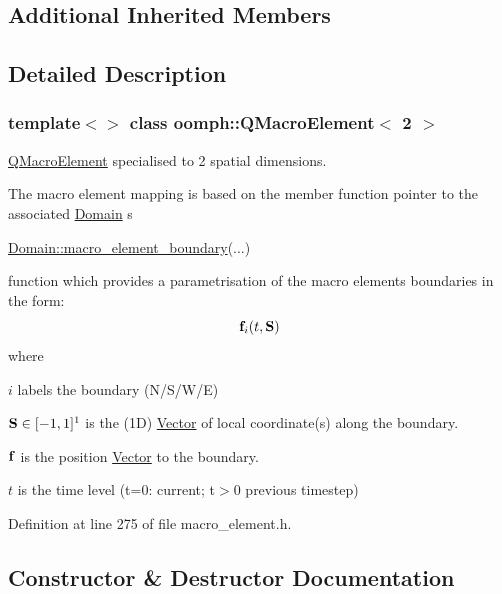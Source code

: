 \subsection*{Additional Inherited Members}


\subsection{Detailed Description}
\subsubsection*{template$<$$>$\newline
class oomph\+::\+Q\+Macro\+Element$<$ 2 $>$}

\hyperlink{classoomph_1_1QMacroElement}{Q\+Macro\+Element} specialised to 2 spatial dimensions.

The macro element mapping is based on the member function pointer to the associated \hyperlink{classoomph_1_1Domain}{Domain} \textquotesingle{}s 
\begin{DoxyCode}
\hyperlink{classoomph_1_1Domain_a95f3e00d28ea37e6c4d3027bfac91096}{Domain::macro\_element\_boundary}(...) 
\end{DoxyCode}
 function which provides a parametrisation of the macro element\textquotesingle{}s boundaries in the form\+: \[ {\bf f}_{i} (t,{\bf S}) \] where
\begin{DoxyItemize}
\item $ i $ labels the boundary (N/\+S/\+W/E)
\item $ {\bf S} \in [-1,1]^1 $ is the (1D) \hyperlink{classoomph_1_1Vector}{Vector} of local coordinate(s) along the boundary.
\item $ {\bf f} $ is the position \hyperlink{classoomph_1_1Vector}{Vector} to the boundary.
\item $ t $ is the time level (t=0\+: current; t$>$0 previous timestep) 
\end{DoxyItemize}

Definition at line 275 of file macro\+\_\+element.\+h.



\subsection{Constructor \& Destructor Documentation}
\mbox{\label{classoomph_1_1QMacroElement_3_012_01_4_a9a9a57f0903e521371ce99c06f81154f}} 
